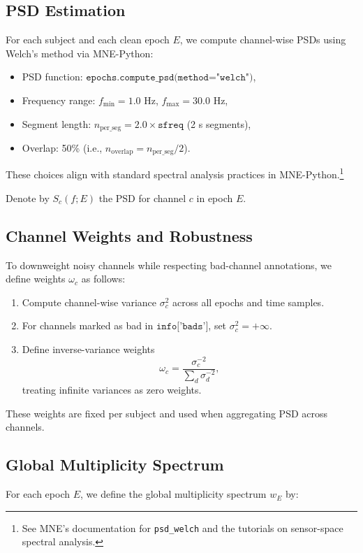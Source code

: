 \documentclass[11pt]{article}
\begin{document}
\subsection{PSD Estimation}

For each subject and each clean epoch \(E\), we compute channel-wise PSDs using Welch's method via MNE-Python:
\begin{itemize}
  \item PSD function: \(\texttt{epochs.compute\_psd(method="welch")}\),
  \item Frequency range: \(f_{\mathrm{min}} = 1.0\) Hz, \(f_{\mathrm{max}} = 30.0\) Hz,
  \item Segment length: \(n_{\mathrm{per\_seg}} = 2.0 \times \texttt{sfreq}\) (2 s segments),
  \item Overlap: 50\% (i.e., \(n_{\mathrm{overlap}} = n_{\mathrm{per\_seg}}/2\)).
\end{itemize}
These choices align with standard spectral analysis practices in MNE-Python.\footnote{See MNE's documentation for \texttt{psd\_welch} and the tutorials on sensor-space spectral analysis.}

Denote by \(S_c(f;E)\) the PSD for channel \(c\) in epoch \(E\).

\subsection{Channel Weights and Robustness}

To downweight noisy channels while respecting bad-channel annotations, we define weights \(\omega_c\) as follows:
\begin{enumerate}[leftmargin=*]
  \item Compute channel-wise variance \(\sigma_c^2\) across all epochs and time samples.
  \item For channels marked as bad in \(\texttt{info['bads']}\), set \(\sigma_c^2 = +\infty\).
  \item Define inverse-variance weights
  \[
    \omega_c = \frac{\sigma_c^{-2}}{\sum_{d} \sigma_d^{-2}},
  \]
  treating infinite variances as zero weights.
\end{enumerate}
These weights are fixed per subject and used when aggregating PSD across channels.

\subsection{Global Multiplicity Spectrum}

For each epoch \(E\), we define the global multiplicity spectrum \(w_E\) by:
\end{document}
